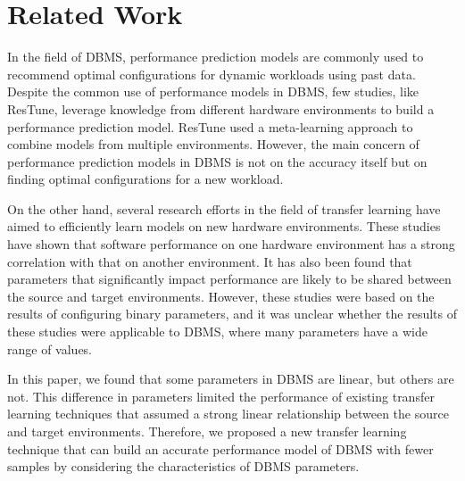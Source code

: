 \section{Related Work}
In the field of DBMS, performance prediction models are commonly used to recommend optimal configurations for dynamic workloads using past data\cite{Ottertune,Onlinetune,cdbtune,mysql197}. 
Despite the common use of performance models in DBMS, few studies, like ResTune, leverage knowledge from different hardware environments to build a performance prediction model\cite{restune}.
ResTune used a meta-learning approach to combine models from multiple environments.
However, the main concern of performance prediction models in DBMS is not on the accuracy itself but on finding optimal configurations for a new workload.

On the other hand, several research efforts in the field of transfer learning have aimed to efficiently learn models on new hardware environments. These studies have shown that software performance on one hardware environment has a strong correlation with that on another environment\cite{Valov,jamshidi}. It has also been found that parameters that significantly impact performance are likely to be shared between the source and target environments\cite{jamshidi,l2s}. However, these studies were based on the results of configuring binary parameters, and it was unclear whether the results of these studies were applicable to DBMS, where many parameters have a wide range of values.

In this paper, we found that some parameters in DBMS are linear, but others are not.
This difference in parameters limited the performance of existing transfer learning techniques that assumed a strong linear relationship between the source and target environments\cite{Valov,datareuse}.
Therefore, we proposed a new transfer learning technique that can build an accurate performance model of DBMS with fewer samples by considering the characteristics of DBMS parameters.